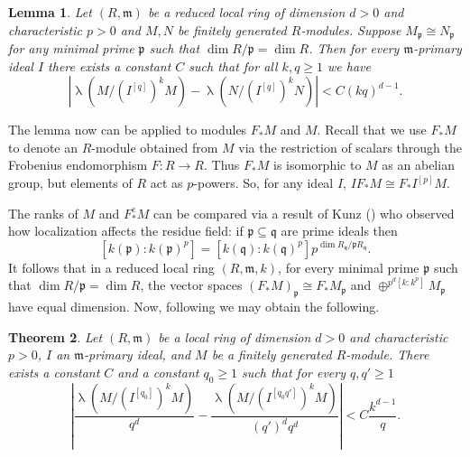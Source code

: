 \documentclass[12pt]{amsart}
\newcommand{\length}{\operatorname{\lambda}}
\newcommand{\mf}[1]{\mathfrak #1}
\DeclareMathOperator{\Minh}{Minh}
\DeclareMathOperator{\Hom}{Hom}
\renewcommand{\frq}[1]{{#1}^{[q]}}
\newtheorem{theorem}{Theorem}
\newtheorem{lemma}[theorem]{Lemma}
\theoremstyle{definition}
\theoremstyle{remark}
\numberwithin{theorem}{section}
\numberwithin{equation}{section}
\begin{document}
\begin{lemma}\label{min primes}
Let $(R, \mf m)$ be a reduced local ring  of dimension $d > 0$ and characteristic $p > 0$ and $M,N$ be finitely generated $R$-modules.
Suppose $M_\mf p \cong  N_\mf p$ for any minimal prime $\mf p$ such that $\dim R/\mf p= \dim R$.
Then for every $\mf m$-primary ideal $I$ 
there exists a constant $C$ such that for all $k,q \geq 1$ 
we have
\[
|\length (M/(\frq{I})^kM) - \length (N/(\frq{I})^kN)| < C (kq)^{d - 1}.
\] 
\end{lemma}
%


The lemma now can be applied to modules $F_* M$ and $M$. 
Recall that we use $F_* M$ to denote an $R$-module obtained from $M$ 
via the restriction of scalars through the Frobenius endomorphism $F \colon R \to R$.
Thus $F_* M$ is isomorphic to $M$ as an abelian group, but elements of $R$ act as $p$-powers.
So, for any ideal $I$, $IF_* M \cong F_* I^{[p]}M$. 

The ranks of $M$ and $F_*^e M$ can be compared via a result of
Kunz (\cite[Proposition~2.3]{Kunz2}) who observed how localization affects the residue field:
if $\mf p \subseteq \mf q$ are prime ideals then
\[[k(\mf p) : k(\mf p)^p] = [k(\mf q) : k(\mf q)^p] p^{\dim R_\mf q/\mf pR_\mf q}.\]
It follows that in a reduced local ring $(R, \mf m, k)$, for every minimal prime $\mf p$ such that 
$\dim R/\mf p = \dim R$, the vector spaces $(F_* M)_\mf p \cong F_* M_\mf p$
and $\oplus^{p^d [k : k^p]} M_\mf p$ have equal dimension.  
Now, following \cite[Proposition~3.4, Corollary~{3.5}, Theorem~3.6]{Tucker} we may obtain the following. 


\begin{theorem}\label{convergence}
Let $(R, \mf m)$ be a local ring of dimension $d > 0$ and characteristic $p > 0$, 
$I$ an $\mf m$-primary ideal, 
and $M$ be a finitely generated $R$-module.
There exists a constant $C$ and a constant $q_0 \geq 1$
such that for every $q, q' \geq 1$ 
\[
\left |\frac{\length (M/(I^{[q_0]})^kM)}{q^d} - \frac{\length (M/(I^{[q_0q']})^kM)}{(q')^d q^d} \right| 
< C \frac{k^{d-1}}{q}.
\]
\end{theorem}
\end{document}
